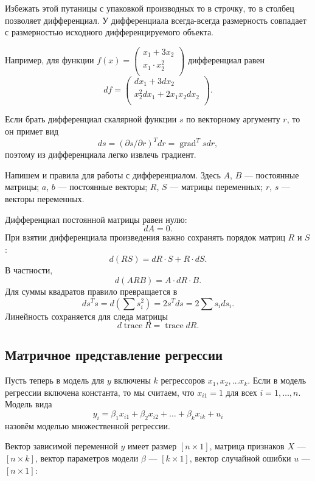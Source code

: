 \documentclass[12pt]{article}
\DeclareMathOperator{\grad}{grad}
\DeclareMathOperator{\trace}{trace}
\begin{document}
Избежать этой путаницы с упаковкой производных то в строчку, то в столбец позволяет дифференциал. 
У дифференциала всегда-всегда размерность совпадает с размерностью исходного дифференцируемого объекта.

Например, для функции $f(x) = \begin{pmatrix}
    x_1 + 3x_2 \\
    x_1 \cdot x_2^2  \\
\end{pmatrix}$ дифференциал равен
\[
df = \begin{pmatrix}
    dx_1 +  3  dx_2 \\
    x_2^2 dx_1 +  2x_1 x_2 dx_2 \\
\end{pmatrix}.
\]

Если брать дифференциал скалярной функции $s$ по векторному аргументу $r$, то он примет вид
\[
ds = (\partial s/\partial r)^T dr = \grad^T s dr,
\]
поэтому из дифференциала легко извлечь градиент. 


Напишем и правила для работы с дифференциалом.
Здесь $A$, $B$ — постоянные матрицы; $a$, $b$ — постоянные векторы; $R$, $S$ — матрицы переменных; $r$, $s$ — векторы переменных.

Дифференциал постоянной матрицы равен нулю:
\[
dA = 0.
\]
При взятии дифференциала произведения важно  сохранять порядок матриц $R$ и $S$:
\[
d(RS) = dR \cdot S + R \cdot dS.
\]
В частности,
\[
d(ARB) = A \cdot dR \cdot B.
\]
Для суммы квадратов правило превращается в 
\[
d s^T s = d(\sum s_i^2) = 2s^T ds = 2 \sum s_i ds_i.
\]
Линейность сохраняется для следа матрицы
\[
d \trace R = \trace dR.
\]


\subsection{Матричное представление регрессии}
Пусть теперь в модель для $y$ включены $k$ регрессоров $x_1, x_2, \dots x_k$. 
Если в модель регрессии включена константа, то мы считаем, что $x_{i1}=1$ для всех $i=1, \dots, n$.
Модель вида
\[
y_i = \beta_1 x_{i1} + \beta_2 x_{i2} + \dots + \beta_k x_{ik} + u_i
\]
назовём моделью множественной регрессии.

Вектор зависимой переменной $y$ имеет размер $[n \times 1]$, матрица признаков $X$ —  $[n \times k]$, вектор параметров модели $\beta$ — $[k \times 1]$, вектор случайной ошибки $u$ — $[n \times 1]$:
\end{document}
